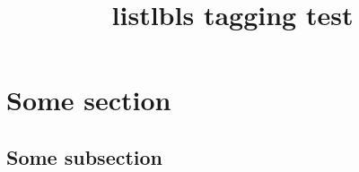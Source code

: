 \documentclass{article}
\title{listlbls tagging test}
\begin{document}
\tableofcontents

\listoflabels

\section{Some section}\label{foo}
\subsection{Some subsection}\label{baz}
\end{document}
